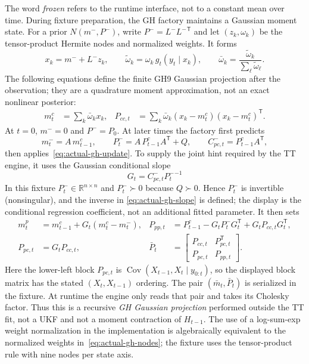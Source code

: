 \documentclass[11pt]{article}
\begin{document}
The word \emph{frozen} refers to the runtime interface, not to a constant
mean over time.  During fixture preparation, the GH factory maintains a
Gaussian moment state.  For a prior $N(m^-,P^-)$, write
$P^-=L^-{L^-}^{\mathsf T}$ and let $(z_k,\omega_k)$ be the tensor-product
Hermite nodes and normalized weights.  It forms
\begin{equation}
  x_k=m^-+L^-z_k,\qquad
  \widetilde\omega_k=\omega_k\,g_t(y_t\mid x_k),\qquad
  \bar\omega_k=\frac{\widetilde\omega_k}{\sum_\ell\widetilde\omega_\ell}.
  \label{eq:actual-gh-nodes}
\end{equation}
The following equations define the finite GH9 Gaussian projection after the
observation; they are a quadrature moment approximation, not an exact
nonlinear posterior:
\begin{align}
  m_t^c&=\sum_k\bar\omega_kx_k,&
  P_{cc,t}&=\sum_k\bar\omega_k
    (x_k-m_t^c)(x_k-m_t^c)^\mathsf T.
  \label{eq:actual-gh-update}
\end{align}
At $t=0$, $m^-=0$ and $P^-=P_0$.  At later times the factory first predicts
\begin{equation}
  m_t^-=A\,m_{t-1}^c,\qquad
  P_t^-=A\,P_{t-1}^cA^\mathsf T+Q,\qquad
  C_{pc,t}^-=P_{t-1}^cA^\mathsf T,
  \label{eq:actual-gh-prediction}
\end{equation}
then applies~\eqref{eq:actual-gh-update}.  To supply the joint hint required by
the TT engine, it uses the Gaussian conditional slope
\begin{equation}
  G_t=C_{pc,t}^-{P_t^-}^{-1}
  \label{eq:actual-gh-slope}
\end{equation}
In this fixture $P_t^-\in\mathbb R^{n\times n}$ and
$P_t^-\succ0$ because $Q\succ0$.  Hence $P_t^-$ is invertible (nonsingular),
and the inverse in
\eqref{eq:actual-gh-slope} is defined; the display is the conditional
regression coefficient, not an additional fitted parameter.  It then sets
\begin{align}
  m_t^p&=m_{t-1}^c+G_t(m_t^c-m_t^-),&
  P_{pp,t}&=P_{t-1}^c-G_tP_t^-G_t^\mathsf T
                    +G_tP_{cc,t}G_t^\mathsf T,\\
  P_{pc,t}&=G_tP_{cc,t},&
  \bar P_t&=
  \begin{bmatrix}P_{cc,t}&P_{pc,t}^\mathsf T\\
                  P_{pc,t}&P_{pp,t}\end{bmatrix}.
  \label{eq:actual-gh-joint}
\end{align}
Here the lower-left block $P_{pc,t}$ is
$\operatorname{Cov}(X_{t-1},X_t\mid y_{0:t})$, so the displayed block matrix
has the stated $(X_t,X_{t-1})$ ordering.
The pair $(\bar m_t,\bar P_t)$ is serialized in the fixture.  At runtime the
engine only reads that pair and takes its Cholesky factor.  Thus this is a
recursive \emph{GH Gaussian projection} performed outside the TT fit, not a
UKF and not a moment contraction of $H_{t-1}$.  The use of a log-sum-exp
weight normalization in the implementation is algebraically equivalent to
the normalized weights in~\eqref{eq:actual-gh-nodes}; the fixture uses the
tensor-product rule with nine nodes per state axis.
\end{document}
